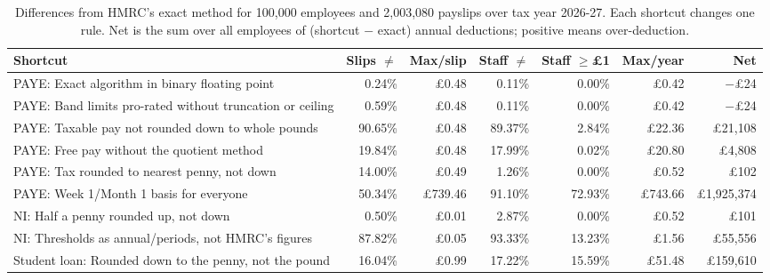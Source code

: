 \begin{table}[t]
\centering
\caption{Differences from HMRC's exact method for 100,000 employees and 2,003,080 payslips over tax year 2026-27. Each shortcut changes one rule. Net is the sum over all employees of (shortcut $-$ exact) annual deductions; positive means over-deduction.}
\label{tab:main}
\footnotesize
\setlength{\tabcolsep}{3pt}
\begin{tabular}{p{6.2cm}rrrrrr}
\toprule
Shortcut & Slips $\neq$ & Max/slip & Staff $\neq$ & Staff $\geq$\pounds1 & Max/year & Net \\
\midrule
PAYE: Exact algorithm in binary floating point & 0.24\% & \pounds0.48 & 0.11\% & 0.00\% & \pounds0.42 & $-$\pounds24 \\
PAYE: Band limits pro-rated without truncation or ceiling & 0.59\% & \pounds0.48 & 0.11\% & 0.00\% & \pounds0.42 & $-$\pounds24 \\
PAYE: Taxable pay not rounded down to whole pounds & 90.65\% & \pounds0.48 & 89.37\% & 2.84\% & \pounds22.36 & \pounds21,108 \\
PAYE: Free pay without the quotient method & 19.84\% & \pounds0.48 & 17.99\% & 0.02\% & \pounds20.80 & \pounds4,808 \\
PAYE: Tax rounded to nearest penny, not down & 14.00\% & \pounds0.49 & 1.26\% & 0.00\% & \pounds0.52 & \pounds102 \\
PAYE: Week 1/Month 1 basis for everyone & 50.34\% & \pounds739.46 & 91.10\% & 72.93\% & \pounds743.66 & \pounds1,925,374 \\
NI: Half a penny rounded up, not down & 0.50\% & \pounds0.01 & 2.87\% & 0.00\% & \pounds0.52 & \pounds101 \\
NI: Thresholds as annual/periods, not HMRC's figures & 87.82\% & \pounds0.05 & 93.33\% & 13.23\% & \pounds1.56 & \pounds55,556 \\
Student loan: Rounded down to the penny, not the pound & 16.04\% & \pounds0.99 & 17.22\% & 15.59\% & \pounds51.48 & \pounds159,610 \\
\bottomrule
\end{tabular}
\end{table}
